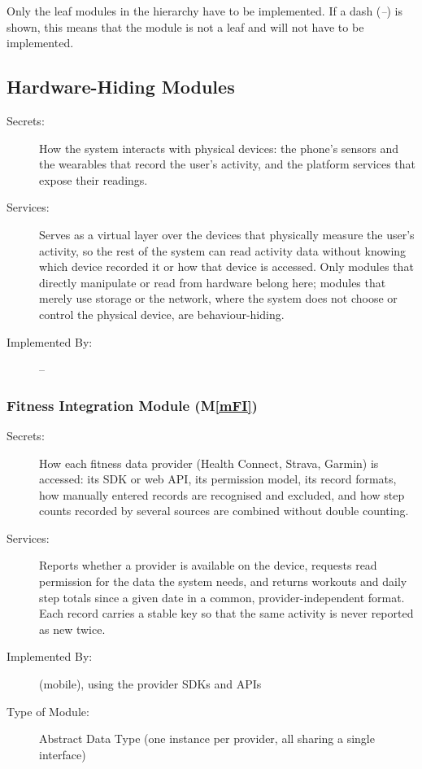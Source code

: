 \documentclass[12pt, titlepage]{article}
\newcommand{\mref}[1]{M\ref{#1}}
\begin{document}
Only the leaf modules in the hierarchy have to be implemented. If a dash
(\emph{--}) is shown, this means that the module is not a leaf and will not have
to be implemented.

\subsection{Hardware-Hiding Modules}

\begin{description}
\item[Secrets:] How the system interacts with physical devices: the phone's
  sensors and the wearables that record the user's activity, and the platform
  services that expose their readings.
\item[Services:] Serves as a virtual layer over the devices that physically
  measure the user's activity, so the rest of the system can read activity data
  without knowing which device recorded it or how that device is accessed. Only
  modules that directly manipulate or read from hardware belong here; modules
  that merely use storage or the network, where the system does not choose or
  control the physical device, are behaviour-hiding.
\item[Implemented By:] --
\end{description}

\subsubsection{Fitness Integration Module (\mref{mFI})}

\begin{description}
\item[Secrets:] How each fitness data provider (Health Connect, Strava, Garmin)
  is accessed: its SDK or web API, its permission model, its record formats,
  how manually entered records are recognised and excluded, and how step counts
  recorded by several sources are combined without double counting.
\item[Services:] Reports whether a provider is available on the device,
  requests read permission for the data the system needs, and returns workouts
  and daily step totals since a given date in a common, provider-independent
  format. Each record carries a stable key so that the same activity is never
  reported as new twice.
\item[Implemented By:] \progname{} (mobile), using the provider SDKs and APIs
\item[Type of Module:] Abstract Data Type (one instance per provider, all
  sharing a single interface)
\end{description}
\end{document}
